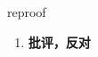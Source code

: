 
\begin{frame}
{\huge reproof}
\begin{center}
\begin{enumerate}\Large
  \item \textbf{批评，反对}
\end{enumerate}
\end{center}
\end{frame}
